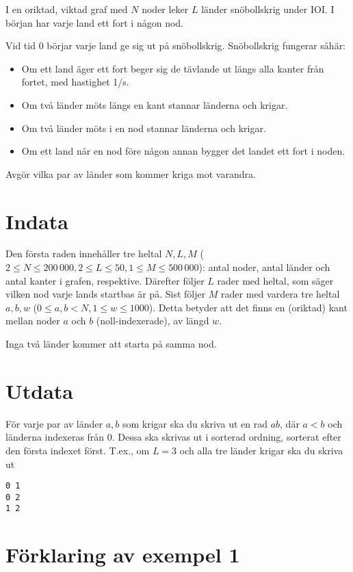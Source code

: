
I en oriktad, viktad graf med $N$ noder leker $L$ länder snöbollskrig under IOI.
I början har varje land ett fort i någon nod.

Vid tid $0$ börjar varje land ge sig ut på snöbollskrig. Snöbollskrig fungerar såhär:

\begin{itemize}
\item Om ett land äger ett fort beger sig de tävlande ut längs alla kanter från fortet, med hastighet 1/s.
\item Om två länder möts längs en kant stannar länderna och krigar.
\item Om två länder möts i en nod stannar länderna och krigar.
\item Om ett land når en nod före någon annan bygger det landet ett fort i noden.
\end{itemize}

Avgör vilka par av länder som kommer kriga mot varandra.

\section*{Indata}

Den första raden innehåller tre heltal $N,L,M$ ($2 \le N \le 200\,000, 2 \le L \le 50, 1 \le M \le 500\,000$):
antal noder, antal länder och antal kanter i grafen, respektive.
Därefter följer $L$ rader med heltal, som säger vilken nod varje lands startbas är på.
Sist följer $M$ rader med vardera tre heltal $a, b, w$ ($0 \le a,b < N, 1 \le w \le 1000$).
Detta betyder att det finns en (oriktad) kant mellan noder $a$ och $b$ (noll-indexerade), av längd $w$.

Inga två länder kommer att starta på samma nod.

\section*{Utdata}

För varje par av länder $a, b$ som krigar ska du skriva ut en rad $a b$, där $a < b$ och länderna indexeras från $0$.
Dessa ska skrivas ut i sorterad ordning, sorterat efter den första indexet först.
T.ex., om $L = 3$ och alla tre länder krigar ska du skriva ut
\begin{lstlisting}
0 1
0 2
1 2
\end{lstlisting}

\section*{Förklaring av exempel 1}

